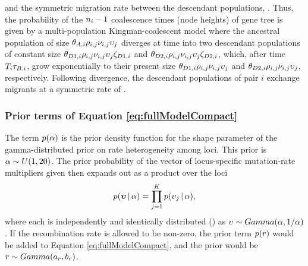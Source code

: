 \begin{linenomath}
and the symmetric migration rate between the descendant populations,
\migrationRate{}.
Thus, the probability of the $\popSampleSize{i}{}-1$ coalescence times (node
heights) of gene tree  is given by a multi-population
Kingman-coalescent model \cite{Kingman1982} where the ancestral population of
size
$\ancestralTheta{i}\ploidyScalar{i}{j}\mutationRateScalarConstant{i}{j}\locusMutationRateScalar{j}$
diverges at time  into two descendant populations of constant
size
$\descendantTheta{1}{i}\ploidyScalar{i}{j}\mutationRateScalarConstant{i}{j}\locusMutationRateScalar{j}\bottleScalar{1}{i}$
and
$\descendantTheta{2}{i}\ploidyScalar{i}{j}\mutationRateScalarConstant{i}{j}\locusMutationRateScalar{j}\bottleScalar{2}{i}$,
which, after time $\divTimeMap{i}\bottleTime{i}$, grow exponentially to their
present size 
$\descendantTheta{1}{i}\ploidyScalar{i}{j}\mutationRateScalarConstant{i}{j}\locusMutationRateScalar{j}$
and
$\descendantTheta{2}{i}\ploidyScalar{i}{j}\mutationRateScalarConstant{i}{j}\locusMutationRateScalar{j}$,
respectively.
Following divergence, the descendant populations of pair $i$ exchange migrants at a symmetric rate of
.
\end{linenomath}


\subsubsection{Prior terms of Equation \ref{eq:fullModelCompact}}
\begin{linenomath}
The term $p(\alpha)$ is the prior density
function for the shape parameter of the gamma-distributed prior on
rate heterogeneity among loci.
This prior is $\alpha \sim U(1, 20)$.
The prior probability of the vector of locus-specific mutation-rate multipliers
given \locusRateHetShapeParameter then expands out as a product over
the loci
\begin{equation}
    p(\boldsymbol{\upsilon} \,|\, \alpha) =
    \prod_{j=1}^{K}
    p(\upsilon_{j} \,|\, \alpha),
    \label{eq:locusRateHetPrior}
\end{equation}
where each \locusMutationRateScalar{} is independently and identically
distributed (\iid) as
$\upsilon_{} \sim Gamma(\alpha,
1/\alpha)$.
If the recombination rate \recombinationRate is allowed to be
non-zero, the prior term $p(r)$ would be added
to Equation \ref{eq:fullModelCompact}, and the prior would be
$r \sim Gamma(a_{r},
b_{r})$.
\end{linenomath}

